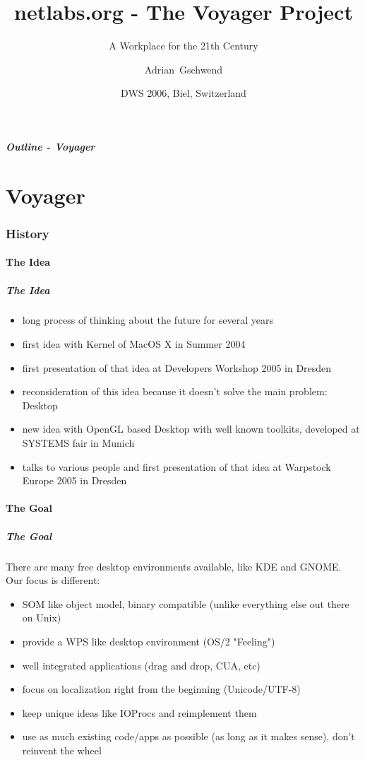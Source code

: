 \documentclass[handout]{beamer}
\title[netlabs.org - The Voyager Project]
{netlabs.org - The Voyager Project}
\subtitle
{A Workplace for the 21th Century}
\author[Adrian Gschwend]
{Adrian~Gschwend}
\institute[netlabs.org]
{
  netlabs.org - Open Source Software for OS/2 and eCS
}
\date[8.4.2006]
{DWS 2006, Biel, Switzerland}
\begin{document}
\begin{frame}
  \titlepage
\end{frame}

\begin{frame}
  \frametitle{Outline - Voyager}
  \tableofcontents[part=1,hideallsubsections]
\end{frame}

\part{Voyager}
\section{History}
\subsection{The Idea}
\begin{frame}
\frametitle{The Idea}
\begin{itemize}
      \item long process of thinking about the future for several years
      \item first idea with Kernel of MacOS X in Summer 2004
      \item first presentation of that idea at Developers Workshop 2005 in Dresden
      \item reconsideration of this idea because it doesn't solve the main problem: Desktop
      \item new idea with OpenGL based Desktop with well known toolkits, developed at SYSTEMS fair in Munich
      \item talks to various people and first presentation of that idea at Warpstock Europe 2005 in Dresden
    \end{itemize}   
\end{frame}

\subsection{The Goal}
\begin{frame}
\frametitle{The Goal}
	There are many free desktop environments available, like KDE and GNOME. Our focus is different:
	\begin{itemize}
		\item SOM like object model, binary compatible (unlike everything else out there on Unix)
		\item provide a WPS like desktop environment (OS/2 "Feeling")
		\item well integrated applications (drag and drop, CUA, etc)
		\item focus on localization right from the beginning (Unicode/UTF-8)
		\item keep unique ideas like IOProcs and reimplement them
		\item use as much existing code/apps as possible (as long as it makes sense), don't reinvent the wheel
	\end{itemize}
\end{frame}
\end{document}

